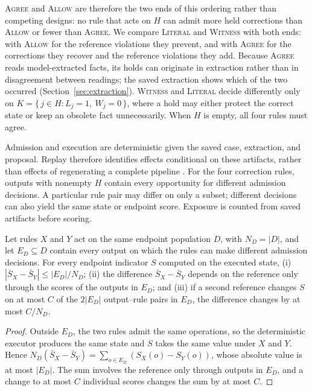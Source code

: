 \documentclass[acmsmall,review]{acmart}
\newcommand{\agree}{\textsc{Agree}}
\newcommand{\allow}{\textsc{Allow}}
\newcommand{\literal}{\textsc{Literal}}
\newcommand{\witness}{\textsc{Witness}}
\begin{document}
\agree{} and \allow{} are therefore the two ends of this ordering rather than competing designs: no rule that acts on $H$ can admit more held corrections than \allow{} or fewer than \agree{}. We compare \literal{} and \witness{} with both ends: with \allow{} for the reference violations they prevent, and with \agree{} for the corrections they recover and the reference violations they add. Because \agree{} reads model-extracted facts, its holds can originate in extraction rather than in disagreement between readings; the saved extraction shows which of the two occurred (Section~\ref{sec:extraction}). \witness{} and \literal{} decide differently only on $K=\{\,j\in H : L_j=1,\ W_j=0\,\}$, where a hold may either protect the correct state or keep an obsolete fact unnecessarily. When $H$ is empty, all four rules must agree.

Admission and execution are deterministic given the saved case, extraction, and proposal. Replay therefore identifies effects conditional on these artifacts, rather than effects of regenerating a complete pipeline \cite{cite53}. For the four correction rules, outputs with nonempty $H$ contain every opportunity for different admission decisions. A particular rule pair may differ on only a subset; different decisions can also yield the same state or endpoint score. Exposure is counted from saved artifacts before scoring.

\begin{proposition}\label{prop:1}
Let rules $X$ and $Y$ act on the same endpoint population $D$, with $N_D=|D|$, and let $E_D\subseteq D$ contain every output on which the rules can make different admission decisions. For every endpoint indicator $S$ computed on the executed state, (i) $|\bar S_X-\bar S_Y|\le |E_D|/N_D$; (ii) the difference $\bar S_X-\bar S_Y$ depends on the reference only through the scores of the outputs in $E_D$; and (iii) if a second reference changes $S$ on at most $C$ of the $2|E_D|$ output--rule pairs in $E_D$, the difference changes by at most $C/N_D$.
\end{proposition}
\begin{proof}
Outside $E_D$, the two rules admit the same operations, so the deterministic executor produces the same state and $S$ takes the same value under $X$ and $Y$. Hence $N_D(\bar S_X-\bar S_Y)=\sum_{o\in E_D}(S_X(o)-S_Y(o))$, whose absolute value is at most $|E_D|$. The sum involves the reference only through outputs in $E_D$, and a change to at most $C$ individual scores changes the sum by at most $C$.
\end{proof}
\end{document}
